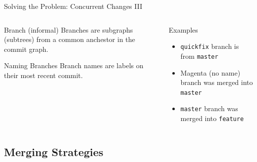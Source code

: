 \documentclass[xetex]{beamer}
\begin{document}
\begin{frame}[fragile]{Solving the Problem: Concurrent Changes III}
  \begin{columns}[t]
    \begin{column}{.5\linewidth}
      \begin{block}{Branch (informal)}
        Branches are subgraphs (subtrees) from a common anchestor in the commit
        graph.
      \end{block}
      \begin{alertblock}{Naming Branches}
        Branch names are labels on their most recent commit.
      \end{alertblock}
    \end{column}
    \begin{column}{.5\linewidth}
      \begin{exampleblock}{Examples}
        \begin{itemize}
          \item \texttt{quickfix} branch is from \texttt{master}
          \item Magenta (no name) branch was merged into \texttt{master}
          \item \texttt{master} branch was merged into \texttt{feature}
        \end{itemize}
      \end{exampleblock}
    \end{column}
  \end{columns}
\end{frame}

\subsection{Merging Strategies}
\end{document}
